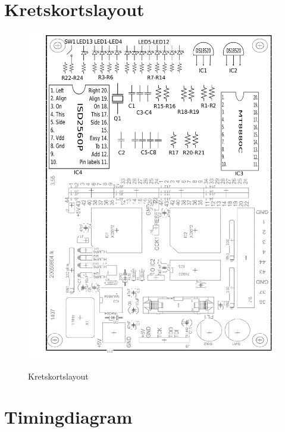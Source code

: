 \documentclass[a4paper,11pt]{article}
\begin{document}
	\section{Kretskortslayout}

	\begin{figure}[ht!]
	  \centering
	      \includegraphics[scale=0.7, angle=0]{layout.png}
		\label{fig:layout}
	  	\caption{Kretskortslayout}
	\end{figure}
	
	\section{Timingdiagram}
\end{document}
